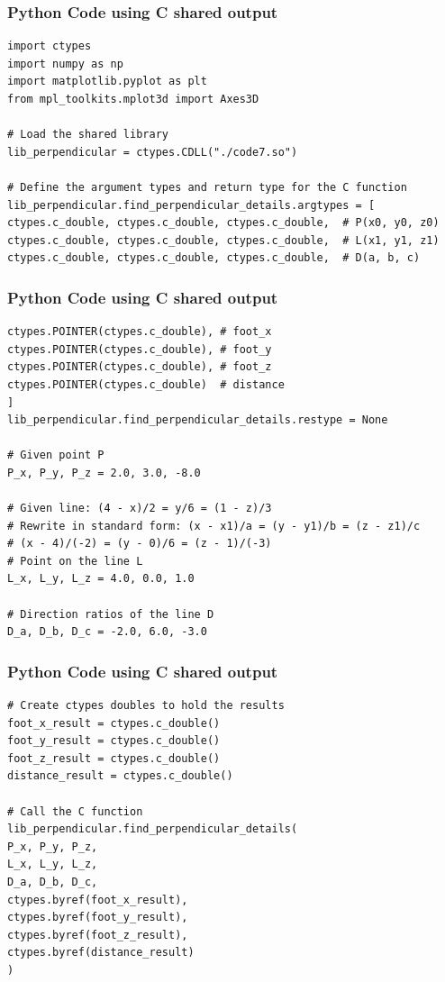 \documentclass{beamer}
\begin{document}
\begin{frame}[fragile]
\frametitle{Python Code using C shared output}
\begin{lstlisting}
import ctypes
import numpy as np
import matplotlib.pyplot as plt
from mpl_toolkits.mplot3d import Axes3D

# Load the shared library
lib_perpendicular = ctypes.CDLL("./code7.so")

# Define the argument types and return type for the C function
lib_perpendicular.find_perpendicular_details.argtypes = [
ctypes.c_double, ctypes.c_double, ctypes.c_double,  # P(x0, y0, z0)
ctypes.c_double, ctypes.c_double, ctypes.c_double,  # L(x1, y1, z1)
ctypes.c_double, ctypes.c_double, ctypes.c_double,  # D(a, b, c)
\end{lstlisting}
\end{frame}

\begin{frame}[fragile]
\frametitle{Python Code using C shared output}
\begin{lstlisting}
ctypes.POINTER(ctypes.c_double), # foot_x
ctypes.POINTER(ctypes.c_double), # foot_y
ctypes.POINTER(ctypes.c_double), # foot_z
ctypes.POINTER(ctypes.c_double)  # distance
]
lib_perpendicular.find_perpendicular_details.restype = None

# Given point P
P_x, P_y, P_z = 2.0, 3.0, -8.0

# Given line: (4 - x)/2 = y/6 = (1 - z)/3
# Rewrite in standard form: (x - x1)/a = (y - y1)/b = (z - z1)/c
# (x - 4)/(-2) = (y - 0)/6 = (z - 1)/(-3)
# Point on the line L
L_x, L_y, L_z = 4.0, 0.0, 1.0

# Direction ratios of the line D
D_a, D_b, D_c = -2.0, 6.0, -3.0
\end{lstlisting}
\end{frame}

\begin{frame}[fragile]
\frametitle{Python Code using C shared output}
\begin{lstlisting}
# Create ctypes doubles to hold the results
foot_x_result = ctypes.c_double()
foot_y_result = ctypes.c_double()
foot_z_result = ctypes.c_double()
distance_result = ctypes.c_double()

# Call the C function
lib_perpendicular.find_perpendicular_details(
P_x, P_y, P_z,
L_x, L_y, L_z,
D_a, D_b, D_c,
ctypes.byref(foot_x_result),
ctypes.byref(foot_y_result),
ctypes.byref(foot_z_result),
ctypes.byref(distance_result)
)
\end{lstlisting}
\end{frame}
\end{document}
